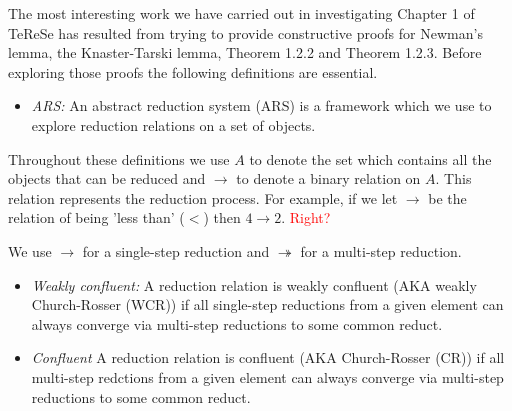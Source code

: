 \documentclass{scrartcl}
\newcommand{\tto}{\twoheadrightarrow}
\begin{document}
The most interesting work we have carried out in investigating Chapter 1 of TeReSe has resulted from trying to provide constructive proofs for Newman's lemma, the Knaster-Tarski lemma, Theorem 1.2.2 and Theorem 1.2.3. Before exploring those proofs the following definitions are essential.
\begin{itemize}
  \item \textit{ARS:} An abstract reduction system (ARS) is a framework which we use to explore reduction relations on a set of objects.
\end{itemize}
Throughout these definitions we use $A$ to denote the set which contains all the objects that can be reduced and $\to$ to denote a binary relation on $A$. This relation represents the reduction process. For example, if we let $\to$ be the relation of being 'less than' ($<$) then $4 \to 2$. \textcolor{red}{Right?}

We use $\to$ for a single-step reduction and $\tto$ for a multi-step reduction.

\begin{itemize}
  \item \textit{Weakly confluent:} A reduction relation is weakly confluent (AKA weakly Church-Rosser (WCR)) if all single-step reductions from a given element can always converge via multi-step reductions to some common reduct.
\end{itemize}
\begin{center}
\end{center}

\begin{itemize}
  \item \textit{Confluent} A reduction relation is confluent (AKA Church-Rosser (CR)) if all multi-step redctions from a given element can always converge via multi-step reductions to some common reduct.
\end{itemize}
\begin{center}
\end{center}
\end{document}
